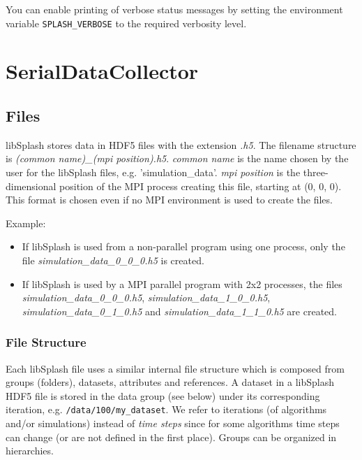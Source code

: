 \documentclass[a4paper,10pt,BCOR12mm]{report}
\newcommand{\command}[1]{\small \texttt{#1}}
\newcommand{\code}[1]{\small \texttt{#1}}
\begin{document}
You can enable printing of verbose status messages by setting the environment variable
\command{SPLASH\_VERBOSE} to the required verbosity level.


\chapter{SerialDataCollector}

\section{Files}

libSplash stores data in HDF5 files with the extension \emph{.h5}.
The filename structure is \emph{(common name)\_(mpi position).h5}.
\emph{common name} is the name chosen by the user for the libSplash files, e.g.
'simulation\_data'.
\emph{mpi position} is the three-dimensional position of the MPI process creating this
file, starting at (0, 0, 0).
This format is chosen even if no MPI environment is used to create the files.

Example:
\begin{itemize}
	\item If libSplash is used from a non-parallel program using one process,
	  only the file \emph{simulation\_data\_0\_0\_0.h5} is created.

	\item If libSplash is used by a MPI parallel program with 2x2 processes, the files
	\emph{simulation\_data\_0\_0\_0.h5}, \emph{simulation\_data\_1\_0\_0.h5},
	\emph{simulation\_data\_0\_1\_0.h5} and \emph{simulation\_data\_1\_1\_0.h5} are created.
\end{itemize}


\subsection{File Structure}

Each libSplash file uses a similar internal file structure which is composed from groups (folders),
datasets, attributes and references. A dataset in a libSplash HDF5 file is stored in the data group
(see below) under its corresponding iteration, e.g. \code{/data/100/my\_dataset}.
We refer to iterations (of algorithms and/or simulations) instead of \textit{time steps}
since for some algorithms time steps can change (or are not defined in the first place).
Groups can be organized in hierarchies.
\end{document}

